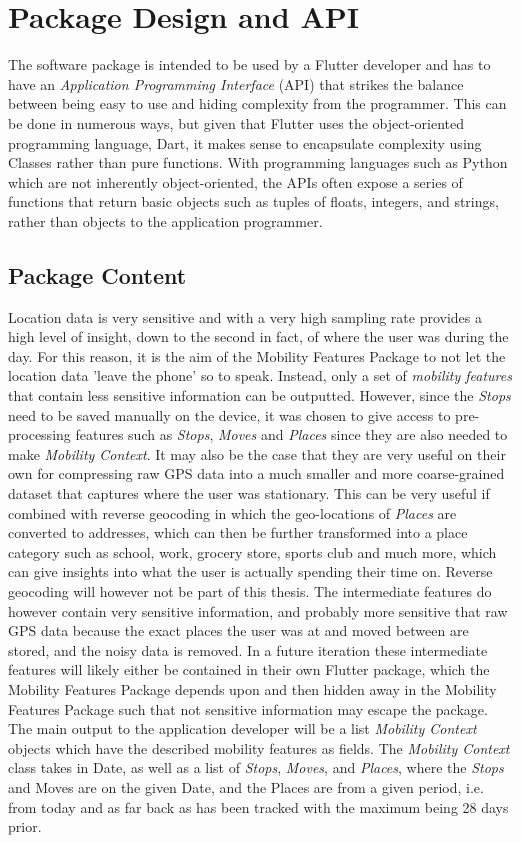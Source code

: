 \section{Package Design and API}
The software package is intended to be used by a Flutter developer and has to have an \textit{Application Programming Interface} (API) that strikes the balance between being easy to use and hiding complexity from the programmer. This can be done in numerous ways, but given that Flutter uses the object-oriented programming language, Dart, it makes sense to encapsulate complexity using Classes rather than pure functions. With programming languages such as Python which are not inherently object-oriented, the APIs often expose a series of functions that return basic objects such as tuples of floats, integers, and strings, rather than objects to the application programmer.

\subsection{Package Content}
Location data is very sensitive and with a very high sampling rate provides a high level of insight, down to the second in fact, of where the user was during the day. For this reason, it is the aim of the Mobility Features Package to not let the location data 'leave the phone' so to speak. Instead, only a set of \textit{mobility features} that contain less sensitive information can be outputted. However, since the \textit{Stops} need to be saved manually on the device, it was chosen to give access to pre-processing features such as \textit{Stops}, \textit{Moves} and \textit{Places} since they are also needed to make \textit{Mobility Context}. It may also be the case that they are very useful on their own for compressing raw GPS data into a much smaller and more coarse-grained dataset that captures where the user was stationary. This can be very useful if combined with reverse geocoding in which the geo-locations of \textit{Places} are converted to addresses, which can then be further transformed into a place category such as school, work, grocery store, sports club and much more, which can give insights into what the user is actually spending their time on. Reverse geocoding will however not be part of this thesis. The intermediate features do however contain very sensitive information, and probably more sensitive that raw GPS data because the exact places the user was at and moved between are stored, and the noisy data is removed. In a future iteration these intermediate features will likely either be contained in their own Flutter package, which the Mobility Features Package depends upon and then hidden away in the Mobility Features Package such that not sensitive information may escape the package. The main output to the application developer will be a list \textit{Mobility Context} objects which have the described mobility features as fields. The \textit{Mobility Context} class takes in Date, as well as a list of \textit{Stops}, \textit{Moves}, and \textit{Places}, where the \textit{Stops} and Moves are on the given Date, and the Places are from a given period, i.e. from today and as far back as has been tracked with the maximum being 28 days prior. 

